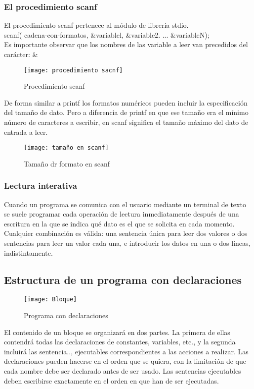 \documentclass[11pt,a4paper]{article}
\begin{document}
 \subsubsection{El procedimiento scanf}
 El procedimiento scanf pertenece al módulo de librería stdio. \\
 scanf( cadena-con-formatos, \&variablel, \&variable2. ... \&variableN);\\
 Es importante observar que los nombres de las variable a leer van precedidos del carácter: \&
 \begin{figure}[htb]
 	\centering
 	\texttt{[image: procedimiento sacnf]}
 	\caption{Procedimiento scanf}
 	\label{fig:Procedimiento scanf}
 \end{figure} 
 
 De forma similar a printf los formatos numéricos pueden incluir la especificación del tamaño de dato. Pero a diferencia de printf en que ese tamaño era el mínimo número de caracteres a escribir, en scanf significa el tamaño máximo del dato de entrada a leer.
 
  \begin{figure}[htb]
 	\centering
 	\texttt{[image: tamaño en scanf]}
 	\caption{Tamaño dr formato en scanf}
 	\label{fig:Procedimiento scanf}
 \end{figure} 
 
 \subsubsection{Lectura interativa}
 Cuando un programa se comunica con el usuario mediante un terminal de 
 texto se suele programar cada operación de lectura inmediatamente después 
 de una escritura en la que se indica qué dato es el que se solicita en cada 
 momento.\\
 Cualquier combinación es válida: una sentencia única para leer dos valores o 
 dos sentencias para leer un valor cada una, e introducir los datos en una o dos 
 líneas, indistintamente.
 \subsection{Estructura de un programa con declaraciones}
 \begin{figure}[htb]
 	\centering
 	\texttt{[image: Bloque]}
 	\caption{Programa con declaraciones}
 	\label{fig:Programa con declaraciones}
 \end{figure} 
 
 El contenido de un bloque se organizará en dos partes. La primera de ellas 
 contendrá todas las declaraciones de constantes, variables, etc., y la segunda 
 incluirá las sentencia.., ejecutables correspondientes a las acciones a realizar.
 Las declaraciones pueden hacerse en el orden que se quiera, con la limitación 
 de que cada nombre debe ser declarado antes de ser usado. Las sentencias 
 ejecutables deben escribirse exactamente en el orden en que han de ser ejecutadas.
 
\end{document}
